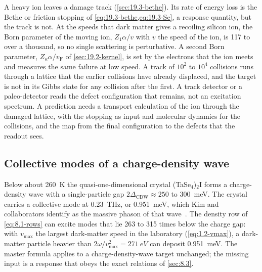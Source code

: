 A heavy ion leaves a damage track (\cref{sec:19.3-bethe}). Its rate of energy loss is the Bethe or friction stopping of \cref{eq:19.3-bethe,eq:19.3-Se}, a response quantity, but the track is not. At the speeds that dark matter gives a recoiling silicon ion, the Born parameter of the moving ion, $Z_1\alpha/v$ with $v$ the speed of the ion, is 117 to over a thousand, so no single scattering is perturbative. A second Born parameter, $Z_\kappa\alpha/v_{\mathrm{F}}$ of \cref{sec:19.2-kernel}, is set by the electrons that the ion meets and measures the same failure at low speed. A track of $10^2$ to $10^4$ collisions runs through a lattice that the earlier collisions have already displaced, and the target is not in its Gibbs state for any collision after the first. A track detector or a paleo-detector reads the defect configuration that remains, not an excitation spectrum. A prediction needs a transport calculation of the ion through the damaged lattice, with the stopping as input and molecular dynamics for the collisions, and the map from the final configuration to the defects that the readout sees.

\subsection{Collective modes of a charge-density wave}\label{sec:22.3-cdw}

Below about \SI{260}{K} the quasi-one-dimensional crystal (TaSe$_4$)$_2$I forms a charge-density wave with a single-particle gap $2\Delta_{\mathrm{CDW}} \approx 250$ to \SI{300}{meV}. The crystal carries a collective mode at \SI{0.23}{THz}, or \SI{0.951}{meV}, which Kim and collaborators identify as the massive phason of that wave~\cite{kim2023observation}. The density row of \cref{eq:8.1-rows} can excite modes that lie 263 to 315 times below the charge gap: with $v_{\mathrm{max}}$ the largest dark-matter speed in the laboratory (\cref{eq:1.2-vmax}), a dark-matter particle heavier than $2\omega/v_{\mathrm{max}}^2 = \SI{271}{eV}$ can deposit \SI{0.951}{meV}. The master formula applies to a charge-density-wave target unchanged; the missing input is a response that obeys the exact relations of \cref{sec:8.3}.

